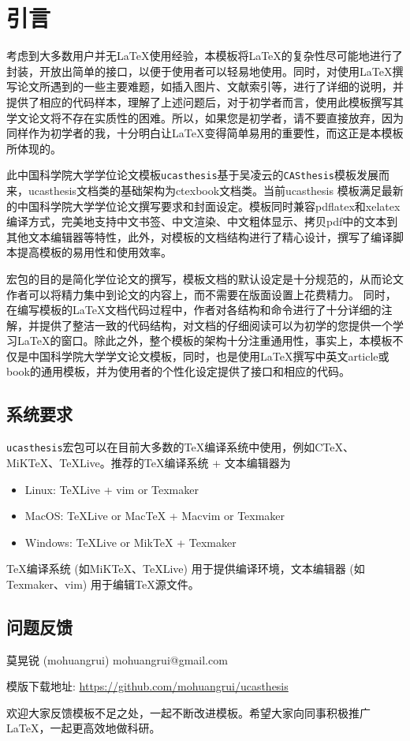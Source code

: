 
\chapter{引言}
\label{chap:introduction}

考虑到大多数用户并无\LaTeX{}使用经验，本模板将\LaTeX{}的复杂性尽可能地进行了封装，开放出简单的接口，以便于使用者可以轻易地使用。同时，对使用\LaTeX{}撰写论文所遇到的一些主要难题，如插入图片、文献索引等，进行了详细的说明，并提供了相应的代码样本，理解了上述问题后，对于初学者而言，使用此模板撰写其学文论文将不存在实质性的困难。所以，如果您是初学者，请不要直接放弃，因为同样作为初学者的我，十分明白让\LaTeX{}变得简单易用的重要性，而这正是本模板所体现的。

此中国科学院大学学位论文模板\texttt{ucasthesis}基于吴凌云的\texttt{CASthesis}模板发展而来，ucasthesis文档类的基础架构为ctexbook文档类。当前ucasthesis 模板满足最新的中国科学院大学学位论文撰写要求和封面设定。模板同时兼容pdflatex和xelatex 编译方式，完美地支持中文书签、中文渲染、中文粗体显示、拷贝pdf中的文本到其他文本编辑器等特性，此外，对模板的文档结构进行了精心设计，撰写了编译脚本提高模板的易用性和使用效率。

宏包的目的是简化学位论文的撰写，模板文档的默认设定是十分规范的，从而论文作者可以将精力集中到论文的内容上，而不需要在版面设置上花费精力。 同时，在编写模板的\LaTeX{}文档代码过程中，作者对各结构和命令进行了十分详细的注解，并提供了整洁一致的代码结构，对文档的仔细阅读可以为初学的您提供一个学习\LaTeX{}的窗口。除此之外，整个模板的架构十分注重通用性，事实上，本模板不仅是中国科学院大学学文论文模板，同时，也是使用\LaTeX{}撰写中英文article或book的通用模板，并为使用者的个性化设定提供了接口和相应的代码。

\section{系统要求}

\texttt{ucasthesis}宏包可以在目前大多数的\TeX{}编译系统中使用，例如C\TeX{}、MiK\TeX{}、\TeX{}Live。推荐的\TeX{}编译系统 + 文本编辑器为
\begin{itemize}
    \item Linux: \TeX{}Live + vim or Texmaker
    \item MacOS: \TeX{}Live or Mac\TeX{} + Macvim or Texmaker
    \item Windows: \TeX{}Live or Mik\TeX{}  + Texmaker
\end{itemize}
\TeX{}编译系统 (如MiK\TeX{}、\TeX{}Live) 用于提供编译环境，文本编辑器 (如Texmaker、vim) 用于编辑\TeX{}源文件。

\section{问题反馈}

\begin{center}
莫晃锐 (mohuangrui) \quad mohuangrui@gmail.com

模版下载地址: \url{https://github.com/mohuangrui/ucasthesis}
\end{center}

欢迎大家反馈模板不足之处，一起不断改进模板。希望大家向同事积极推广\LaTeX{}，一起更高效地做科研。
